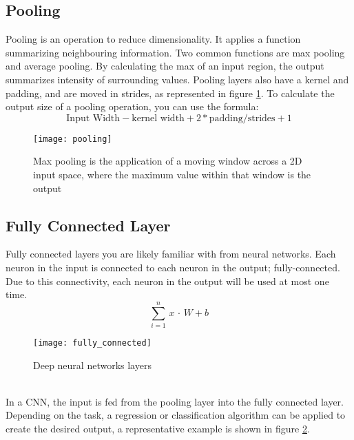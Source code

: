 \subsection{Pooling}
\label{ssec:pooling}
Pooling is an operation to reduce dimensionality. 
It applies a function summarizing neighbouring information.
Two common functions are max pooling and average pooling.
By calculating the max of an input region, the output summarizes intensity of
surrounding values.
Pooling layers also have a kernel and padding, and are moved in strides, as 
represented in figure \ref{fig:pooling}.
To calculate the output size of a pooling operation, you can use the formula:
\begin{equation}
 \text{Input Width} - \text{kernel width} + 2 * \text{padding}  / \text{strides} + 1
\end{equation}
%
\begin{figure}[htb]
\centering
\texttt{[image: pooling]}
\caption{Max pooling is the application of a moving window across a 2D input 
space, where the maximum value within that window is the output}
\label{fig:pooling}
\end{figure}
%
\subsection{Fully Connected Layer}
\label{ssec:fully_connected}
Fully connected layers you are likely familiar with from neural networks.
Each neuron in the input is connected to each neuron in the output;
fully-connected.
Due to this connectivity, each neuron in the output will be used at most one
time.
%
\begin{equation}
  \sum_{i=1}^{n} \,  x \, \cdot \, W+b
\end{equation}
%
\begin{figure}[htb]
\centering
\texttt{[image: fully\_connected]}
\caption{Deep neural networks layers}
\label{fig:fully_connected}
\end{figure}
%
\\\noindent In a CNN, the input is fed from the pooling layer into the fully connected layer.
Depending on the task, a regression or classification algorithm can be applied
to create the desired output, a representative example is shown in figure \ref{fig:fully_connected}.
